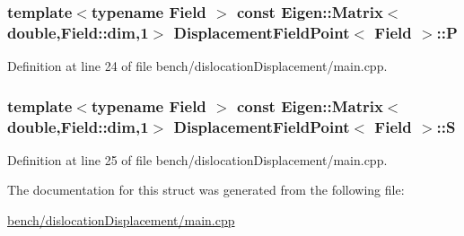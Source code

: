 \subsubsection[{P}]{\setlength{\rightskip}{0pt plus 5cm}template$<$typename Field $>$ const Eigen\+::\+Matrix$<$double,{\bf Field\+::dim},1$>$ {\bf Displacement\+Field\+Point}$<$ Field $>$\+::P}\label{struct_displacement_field_point_acc1985dd4d8d33728bc0ceec7abfd2df}


Definition at line 24 of file bench/dislocation\+Displacement/main.\+cpp.

\hypertarget{struct_displacement_field_point_a1f251b693c9f5fb5659a6be8021ea904}{}
\subsubsection[{S}]{\setlength{\rightskip}{0pt plus 5cm}template$<$typename Field $>$ const Eigen\+::\+Matrix$<$double,{\bf Field\+::dim},1$>$ {\bf Displacement\+Field\+Point}$<$ Field $>$\+::S}\label{struct_displacement_field_point_a1f251b693c9f5fb5659a6be8021ea904}


Definition at line 25 of file bench/dislocation\+Displacement/main.\+cpp.



The documentation for this struct was generated from the following file\+:\begin{DoxyCompactItemize}
\item 
\hyperlink{bench_2dislocation_displacement_2main_8cpp}{bench/dislocation\+Displacement/main.\+cpp}\end{DoxyCompactItemize}
